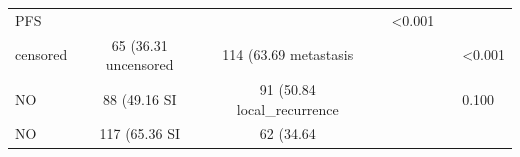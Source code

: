 \begin{table}[!ht]
\begin{tabular}{lcccc}
PFS & & & & <0.001 \\
\hspace{3mm} censored & 65 (36.31%
\hspace{3mm} uncensored & 114 (63.69%
metastasis & & & & <0.001 \\
\hspace{3mm} NO & 88 (49.16%
\hspace{3mm} SI & 91 (50.84%
local_recurrence & & & & 0.100 \\
\hspace{3mm} NO & 117 (65.36%
\hspace{3mm} SI & 62 (34.64%
\bottomrule
\end{tabular}
\label{tab:baseline_characteristics}
\end{table}